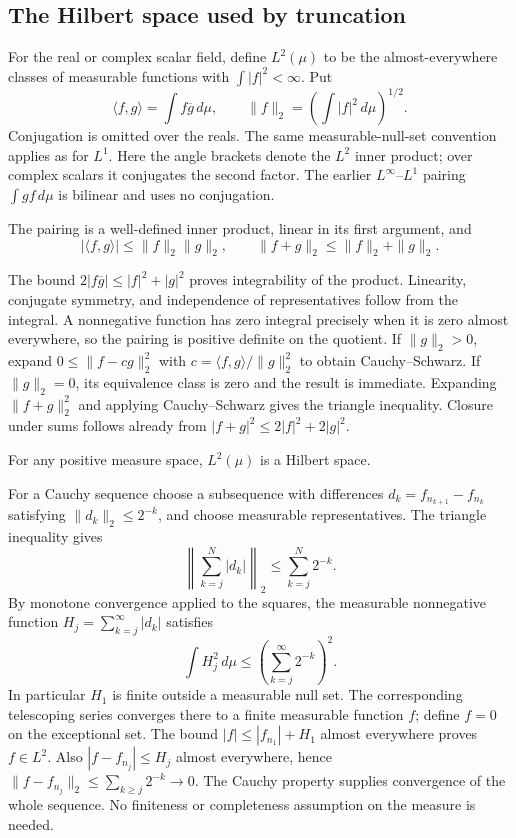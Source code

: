\subsection{The Hilbert space used by truncation}
For the real or complex scalar field, define $L^2(\mu)$ to be the
almost-everywhere classes of measurable functions with $\int|f|^2<\infty$.
Put
\[
\langle f,g\rangle=\int f\overline g\,d\mu,
\qquad \|f\|_2=\left(\int|f|^2\,d\mu\right)^{1/2}.
\]
Conjugation is omitted over the reals. The same measurable-null-set
convention applies as for $L^1$.
Here the angle brackets denote the $L^2$ inner product; over complex
scalars it conjugates the second factor. The earlier $L^\infty$--$L^1$
pairing $\int gf\,d\mu$ is bilinear and uses no conjugation.

\begin{lemma}
The pairing is a well-defined inner product, linear in its first
argument, and
\[
|\langle f,g\rangle|\leq\|f\|_2\|g\|_2,
\qquad \|f+g\|_2\leq\|f\|_2+\|g\|_2.
\]
\end{lemma}
\Proof
The bound $2|f\overline g|\leq|f|^2+|g|^2$ proves integrability of
the product. Linearity, conjugate symmetry, and independence of
representatives follow from the integral. A nonnegative function has
zero integral precisely when it is zero almost everywhere, so the
pairing is positive definite on the quotient. If $\|g\|_2>0$, expand
$0\leq\|f-cg\|_2^2$ with
$c=\langle f,g\rangle/\|g\|_2^2$ to obtain Cauchy--Schwarz. If
$\|g\|_2=0$, its equivalence class is zero and the result is immediate.
Expanding $\|f+g\|_2^2$ and applying Cauchy--Schwarz gives the triangle
inequality. Closure under sums follows already from
$|f+g|^2\leq2|f|^2+2|g|^2$.
\Done

\begin{theorem}[Completeness of $L^2$]
\label{thm:L2_complete}
For any positive measure space, $L^2(\mu)$ is a Hilbert space.
\end{theorem}
\Proof
For a Cauchy sequence choose a subsequence with differences
$d_k=f_{n_{k+1}}-f_{n_k}$ satisfying $\|d_k\|_2\leq2^{-k}$,
and choose measurable representatives. The triangle inequality gives
\[
\left\|\sum_{k=j}^N|d_k|\right\|_2
\leq\sum_{k=j}^N2^{-k}.
\]
By monotone convergence applied to the squares, the measurable
nonnegative function $H_j=\sum_{k=j}^\infty|d_k|$ satisfies
\[
\int H_j^2\,d\mu\leq\left(\sum_{k=j}^\infty2^{-k}\right)^2.
\]
In particular $H_1$ is finite outside a measurable null set. The
corresponding telescoping series converges there to a finite measurable
function $f$; define $f=0$ on the exceptional set.
The bound $|f|\leq|f_{n_1}|+H_1$ almost everywhere proves $f\in L^2$.
Also $|f-f_{n_j}|\leq H_j$ almost everywhere, hence
$\|f-f_{n_j}\|_2\leq\sum_{k\geq j}2^{-k}\to0$.
The Cauchy property supplies convergence of the whole sequence. No
finiteness or completeness assumption on the measure is needed.
\Done


